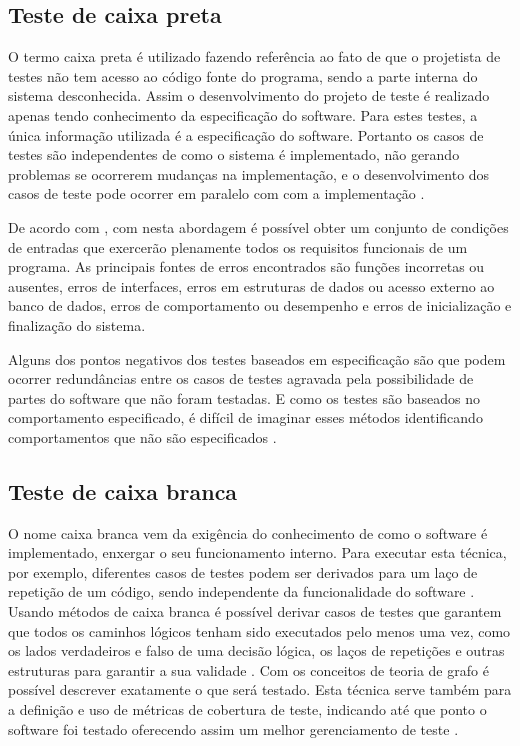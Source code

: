 \subsection{Teste de caixa preta}

O termo caixa preta é utilizado fazendo referência ao fato de que o projetista de testes não tem acesso ao código fonte do programa, sendo a parte interna do sistema desconhecida.  Assim o desenvolvimento do projeto de teste é realizado apenas tendo conhecimento da especificação do software. Para estes testes, a única informação utilizada é a especificação do software. Portanto os casos de testes são independentes de como o sistema é implementado, não gerando problemas se ocorrerem mudanças na implementação, e o desenvolvimento dos casos de teste pode ocorrer em paralelo com com a implementação \cite{jorgensen2016software}.

De acordo com \cite{pressman2005software}, com  nesta abordagem é possível obter um conjunto de condições de entradas que exercerão plenamente todos os requisitos funcionais de um programa. As principais fontes de erros encontrados são funções incorretas ou ausentes, erros de interfaces, erros em estruturas de dados ou acesso externo ao banco de dados, erros de comportamento ou desempenho e erros de inicialização e finalização do sistema.

Alguns dos pontos negativos dos testes baseados em especificação são que podem ocorrer redundâncias entre os casos de testes agravada pela possibilidade de partes do software que não foram testadas. E como os testes são baseados no comportamento especificado, é difícil de imaginar esses métodos identificando comportamentos que não são especificados \cite{jorgensen2016software}.

\subsection{Teste de caixa branca}

O nome caixa branca vem da exigência do conhecimento de como o software é implementado, enxergar o seu funcionamento interno. Para executar esta técnica, por exemplo, diferentes casos de testes podem ser derivados para um laço de repetição de um código, sendo independente da funcionalidade do software \cite{graham2008foundations}. Usando métodos de caixa branca é possível derivar casos de testes que garantem que todos os caminhos lógicos tenham sido executados pelo menos uma vez, como os lados verdadeiros e falso de uma decisão lógica, os laços de repetições e outras estruturas para garantir a sua validade \cite{pressman2005software}. Com os conceitos de teoria de grafo é possível descrever exatamente o que será testado. Esta técnica serve também para a definição e uso de métricas de cobertura de teste, indicando até que ponto o software foi testado oferecendo assim um melhor gerenciamento de teste \cite{jorgensen2016software}.

